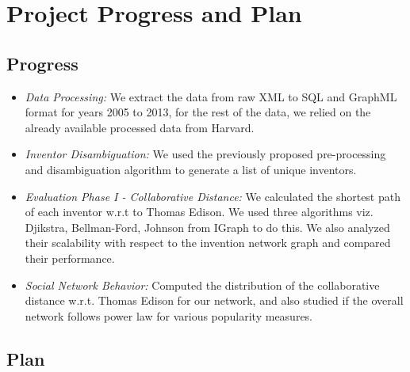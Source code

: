 \section{Project Progress and Plan}


\subsection{Progress}

	\begin{itemize}

		\item {\em Data Processing:} We extract the data from raw XML to SQL and GraphML format for years 2005 to 2013, for the rest of the data, we relied on the already available processed data from Harvard.

		\item {\em Inventor Disambiguation:} We used the previously proposed pre-processing and disambiguation algorithm to
		generate a list of unique inventors.  

		\item {\em Evaluation Phase I - Collaborative Distance:} We calculated the shortest path of each inventor w.r.t
		to Thomas Edison. We used three algorithms viz. Djikstra, Bellman-Ford,	Johnson from IGraph to do this.
		We also analyzed their scalability with respect to the invention network graph and compared their performance.

		\item {\em Social Network Behavior:} Computed the distribution of the collaborative distance w.r.t. Thomas Edison for our network, and also studied if the overall network follows power law for various popularity measures.
	\end{itemize}

\subsection{Plan}

